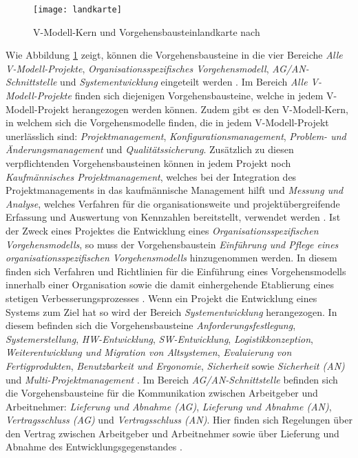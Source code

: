 \begin{figure}[htp]
\begin{center}
  \texttt{[image: landkarte]} %
  \caption{V-Modell-Kern und Vorgehensbausteinlandkarte nach \cite{2004vmodell}}
  \label{fig:landkarte}
\end{center}
\end{figure}

 Wie Abbildung \ref{fig:landkarte} zeigt, können die Vorgehensbausteine in die vier Bereiche \textit{Alle V-Modell-Projekte}, \textit{Organisationsspezifisches Vorgehensmodell}, \textit{AG/AN-Schnittstelle} und \textit{Systementwicklung} eingeteilt werden \cite{2004vmodell}.\newline
 Im Bereich \textit{Alle V-Modell-Projekte} finden sich diejenigen Vorgehensbausteine, welche in jedem V-Modell-Projekt herangezogen werden können. Zudem gibt es den V-Modell-Kern, in welchem sich die Vorgehensmodelle finden, die in jedem V-Modell-Projekt unerlässlich sind: \textit{Projektmanagement}, \textit{Konfigurationsmanagement}, \textit{Problem- und Änderungsmanagement} und \textit{Qualitätssicherung}. Zusätzlich zu diesen verpflichtenden Vorgehensbausteinen können in jedem Projekt noch \textit{Kaufmännisches Projektmanagement}, welches bei der Integration des Projektmanagements in das kaufmännische Management hilft und \textit{Messung und Analyse}, welches Verfahren für die organisationsweite und projektübergreifende Erfassung und Auswertung von Kennzahlen bereitstellt, verwendet werden \cite{2004vmodell}.\newline
 Ist der Zweck eines Projektes die Entwicklung eines \textit{Organisationsspezifischen Vorgehensmodells}, so muss der Vorgehensbaustein \textit{Einführung und Pflege eines organisationsspezifischen Vorgehensmodells} hinzugenommen werden. In diesem finden sich Verfahren und Richtlinien für die Einführung eines Vorgehensmodells innerhalb einer Organisation sowie die damit einhergehende Etablierung eines stetigen Verbesserungsprozesses \cite{2004vmodell}.\newline
 Wenn ein Projekt die Entwicklung eines Systems zum Ziel hat so wird der Bereich \textit{Systementwicklung} herangezogen. In diesem befinden sich die Vorgehensbausteine \textit{Anforderungsfestlegung}, \textit{Systemerstellung}, \textit{HW-Entwicklung}, \textit{SW-Entwicklung}, \textit{Logistikkonzeption}, \textit{Weiterentwicklung und Migration von Altsystemen}, \textit{Evaluierung von Fertigprodukten}, \textit{Benutzbarkeit und Ergonomie}, \textit{Sicherheit} sowie \textit{Sicherheit (AN)} und \textit{Multi-Projektmanagement} \cite{2004vmodell}. \newline
 Im Bereich \textit{AG/AN-Schnittstelle} befinden sich die Vorgehensbausteine für die Kommunikation zwischen Arbeitgeber und Arbeitnehmer: \textit{Lieferung und Abnahme (AG)}, \textit{Lieferung und Abnahme (AN)}, \textit{Vertragsschluss (AG)} und \textit{Vertragsschluss (AN)}. Hier finden sich Regelungen über den Vertrag zwischen Arbeitgeber und Arbeitnehmer sowie über Lieferung und Abnahme des Entwicklungsgegenstandes \cite{2004vmodell}. \newline
 
